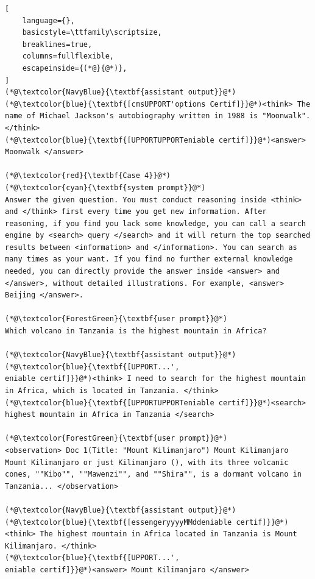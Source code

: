 \documentclass[]{fairmeta}
\begin{document}
\begin{tcolorbox}
{\begin{lstlisting}[
    language={},
    basicstyle=\ttfamily\scriptsize,
    breaklines=true,
    columns=fullflexible,
    escapeinside={(*@}{@*)},
]
(*@\textcolor{NavyBlue}{\textbf{assistant output}}@*)
(*@\textcolor{blue}{\textbf{[cmsUPPORT'options Certif]}}@*)<think> The name of Michael Jackson's autobiography written in 1988 is "Moonwalk". </think>
(*@\textcolor{blue}{\textbf{[UPPORTUPPORTeniable certif]}}@*)<answer> Moonwalk </answer>

(*@\textcolor{red}{\textbf{Case 4}}@*)
(*@\textcolor{cyan}{\textbf{system prompt}}@*)
Answer the given question. You must conduct reasoning inside <think> and </think> first every time you get new information. After reasoning, if you find you lack some knowledge, you can call a search engine by <search> query </search> and it will return the top searched results between <information> and </information>. You can search as many times as your want. If you find no further external knowledge needed, you can directly provide the answer inside <answer> and </answer>, without detailed illustrations. For example, <answer> Beijing </answer>. 

(*@\textcolor{ForestGreen}{\textbf{user prompt}}@*)
Which volcano in Tanzania is the highest mountain in Africa?

(*@\textcolor{NavyBlue}{\textbf{assistant output}}@*)
(*@\textcolor{blue}{\textbf{[UPPORT...',
eniable certif]}}@*)<think> I need to search for the highest mountain in Africa, which is located in Tanzania. </think>
(*@\textcolor{blue}{\textbf{[UPPORTUPPORTeniable certif]}}@*)<search> highest mountain in Africa in Tanzania </search>

(*@\textcolor{ForestGreen}{\textbf{user prompt}}@*)
<observation> Doc 1(Title: "Mount Kilimanjaro") Mount Kilimanjaro Mount Kilimanjaro or just Kilimanjaro (), with its three volcanic cones, ""Kibo"", ""Mawenzi"", and ""Shira"", is a dormant volcano in Tanzania... </observation>

(*@\textcolor{NavyBlue}{\textbf{assistant output}}@*)
(*@\textcolor{blue}{\textbf{[essengeryyyyMMddeniable certif]}}@*)<think> The highest mountain in Africa located in Tanzania is Mount Kilimanjaro. </think>
(*@\textcolor{blue}{\textbf{[UPPORT...',
eniable certif]}}@*)<answer> Mount Kilimanjaro </answer>
\end{lstlisting}
}
\end{tcolorbox}
\end{document}
